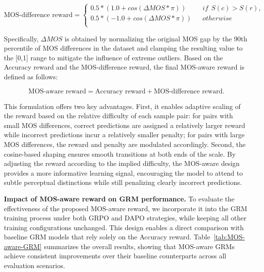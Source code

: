 \begin{equation}
\text{MOS-difference reward}=\left\{
                \begin{array}{lcl}
                        0.5*(1.0+cos(\Delta MOS*\pi))  &     & if\ \ S(c)>S(r),\\
             0.5*(-1.0+cos(\Delta MOS*\pi))  &     & otherwise\\
                \end{array} \right.
\end{equation}

Specifically, $\Delta MOS$ is obtained by normalizing the original MOS gap by the 90th percentile of MOS differences in the dataset and clamping the resulting value to the [0,1] range to mitigate the influence of extreme outliers. Based on the Accuracy reward and the MOS-difference reward, the final MOS-aware reward is defined as follows:

\begin{equation}
\text{MOS-aware reward}=\text{Accuracy reward}+\text{MOS-difference reward}.
\end{equation}

This formulation offers two key advantages. First, it enables adaptive scaling of the reward based on the relative difficulty of each sample pair: for pairs with small MOS differences, correct predictions are assigned a relatively larger reward while incorrect predictions incur a relatively smaller penalty; for pairs with large MOS differences, the reward and penalty are modulated accordingly.
Second, the cosine-based shaping ensures smooth transitions at both ends of the scale. By adjusting the reward according to the implied difficulty, the MOS-aware design provides a more informative learning signal, encouraging the model to attend to subtle perceptual distinctions while still penalizing clearly incorrect predictions.





\textbf{Impact of MOS-aware reward on GRM performance.}
To evaluate the effectiveness of the proposed MOS-aware reward, we incorporate it into the GRM training process under both GRPO and DAPO strategies, while keeping all other training configurations unchanged. This design enables a direct comparison with baseline GRM models that rely solely on the Accuracy reward.
Table~\ref{tab:MOS-aware-GRM} summarizes the overall results, showing that MOS-aware GRMs achieve consistent improvements over their baseline counterparts across all evaluation scenarios.



